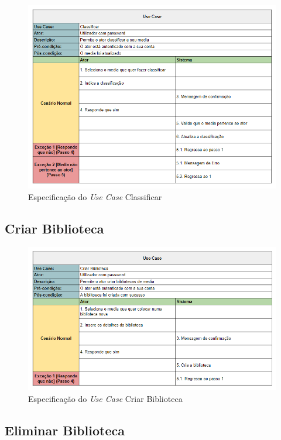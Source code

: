 \documentclass[a4paper]{report}
\begin{document}
\begin{figure}[H]
	\centering 
    \includegraphics[width=\textwidth]{images/Classificar.png}  
    \caption{Especificação do \emph{Use Case} Classificar}
\end{figure}

\subsection{Criar Biblioteca}

\begin{figure}[H]
	\centering 
    \includegraphics[width=\textwidth]{images/Criar_Biblioteca.png}  
    \caption{Especificação do \emph{Use Case} Criar Biblioteca}
\end{figure}

\subsection{Eliminar Biblioteca}
\end{document}
